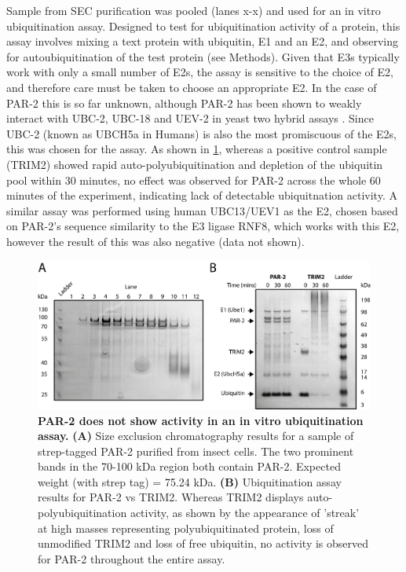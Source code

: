 \documentclass[12pt]{"article"}
\newcommand{\mycaption}[2]{\caption[#1]{\textbf{#1.} #2}}
\begin{document}
Sample from SEC purification was pooled (lanes x-x) and used for an in vitro ubiquitination assay. Designed to test for ubiquitination activity of a protein, this assay involves mixing a text protein with ubiquitin, E1 and an E2, and observing for autoubiquitination of the test protein (see Methods). Given that E3s typically work with only a small number of E2s, the assay is sensitive to the choice of E2, and therefore care must be taken to choose an appropriate E2. In the case of PAR-2 this is so far unknown, although PAR-2 has been shown to weakly interact with UBC-2, UBC-18 and UEV-2 in yeast two hybrid assays \citep{Gudgen2004}. Since UBC-2 (known as UBCH5a in Humans) is also the most promiscuous of the E2s, this was chosen for the assay. As shown in \cref{fig:ubiquitin_assay}, whereas a positive control sample (TRIM2) showed rapid auto-polyubiquitination and depletion of the ubiquitin pool within 30 minutes, no effect was observed for PAR-2 across the whole 60 minutes of the experiment, indicating lack of detectable ubiquitnation activity. A similar assay was performed using human UBC13/UEV1 as the E2, chosen based on PAR-2's sequence similarity to the E3 ligase RNF8, which works with this E2, however the result of this was also negative (data not shown).\\

\begin{figure}
\includegraphics[scale=1]{ubiquitin_assay}
\centering
\mycaption{PAR-2 does not show activity in an in vitro ubiquitination assay}{
\textbf{(A)} Size exclusion chromatography results for a sample of strep-tagged PAR-2 purified from insect cells. The two prominent bands in the 70-100 kDa region both contain PAR-2. Expected weight (with strep tag) = 75.24 kDa.
\textbf{(B)} Ubiquitination assay results for PAR-2 vs TRIM2. Whereas TRIM2 displays auto-polyubiquitination activity, as shown by the appearance of 'streak' at high masses representing polyubiquitinated protein, loss of unmodified TRIM2 and loss of free ubiquitin, no activity is observed for PAR-2 throughout the entire assay. 
}
\label{fig:ubiquitin_assay}
\end{figure}
\end{document}
